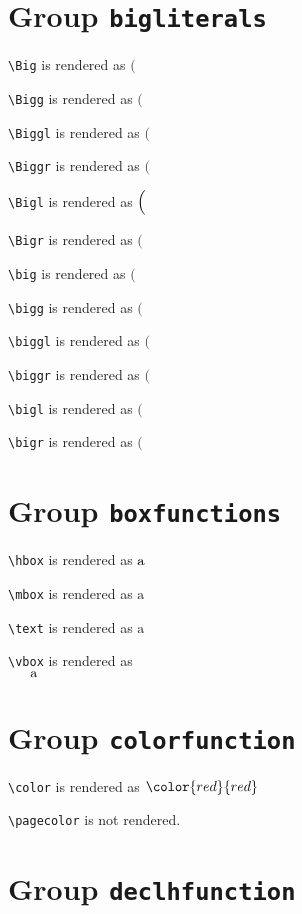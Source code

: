 \section{ Group \texttt{big\textunderscore literals}}

\texttt{\textbackslash Big} is rendered as $\Big($

\texttt{\textbackslash Bigg} is rendered as $\Bigg($

\texttt{\textbackslash Biggl} is rendered as $\Biggl($

\texttt{\textbackslash Biggr} is rendered as $\Biggr($

\texttt{\textbackslash Bigl} is rendered as $\Bigl($

\texttt{\textbackslash Bigr} is rendered as $\Bigr($

\texttt{\textbackslash big} is rendered as $\big($

\texttt{\textbackslash bigg} is rendered as $\bigg($

\texttt{\textbackslash biggl} is rendered as $\biggl($

\texttt{\textbackslash biggr} is rendered as $\biggr($

\texttt{\textbackslash bigl} is rendered as $\bigl($

\texttt{\textbackslash bigr} is rendered as $\bigr($

\section{ Group \texttt{box\textunderscore functions}}

\texttt{\textbackslash hbox} is rendered as $\hbox{a}$

\texttt{\textbackslash mbox} is rendered as $\mbox{a}$

\texttt{\textbackslash text} is rendered as $\text{a}$

\texttt{\textbackslash vbox} is rendered as $\vbox{a}$

\section{ Group \texttt{color\textunderscore function}}

\texttt{\textbackslash color} is rendered as $\color{red}{red}$

\texttt{\textbackslash pagecolor} is not rendered.

\section{ Group \texttt{declh\textunderscore function}}

